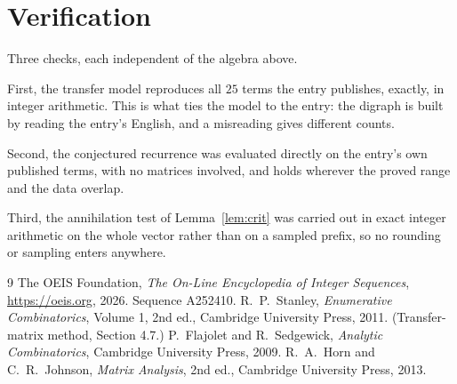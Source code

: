 \documentclass[11pt,a4paper]{article}
\theoremstyle{plain}
\theoremstyle{definition}
\begin{document}
\section{Verification}

Three checks, each independent of the algebra above.

First, the transfer model reproduces all $25$ terms the entry publishes, exactly, in
integer arithmetic. This is what ties the model to the entry: the digraph is built by reading
the entry's English, and a misreading gives different counts.

Second, the conjectured recurrence was evaluated directly on the entry's own published terms,
with no matrices involved, and holds wherever the proved range and the data overlap.

Third, the annihilation test of Lemma~\ref{lem:crit} was carried out in exact integer
arithmetic on the whole vector rather than on a sampled prefix, so no rounding or sampling
enters anywhere.

\begin{thebibliography}{9}
 The OEIS Foundation, \emph{The On-Line Encyclopedia of Integer
Sequences}, \url{https://oeis.org}, 2026. Sequence A252410.
 R.~P.~Stanley, \emph{Enumerative Combinatorics}, Volume 1, 2nd ed.,
Cambridge University Press, 2011. (Transfer-matrix method, Section 4.7.)
 P.~Flajolet and R.~Sedgewick, \emph{Analytic Combinatorics}, Cambridge
University Press, 2009.
 R.~A.~Horn and C.~R.~Johnson, \emph{Matrix Analysis}, 2nd ed., Cambridge
University Press, 2013.
\end{thebibliography}
\end{document}
